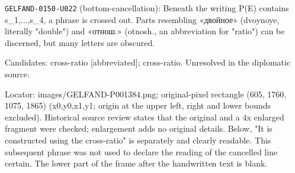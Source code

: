 \noindent\texttt{GELFAND-0150-U022} (bottom-cancellation): Beneath the writing P(E) contains s\_1,...,s\_4, a phrase is crossed out. Parts resembling «двойное» (dvoynoye, literally "double") and «отнош.» (otnosh., an abbreviation for "ratio") can be discerned, but many letters are obscured.\par
Candidates: cross-ratio [abbreviated]; cross-ratio. Unresolved in the diplomatic source.\par
Locator: images/GELFAND-P001384.png; original-pixel rectangle (605, 1760, 1075, 1865) (x0,y0,x1,y1; origin at the upper left, right and lower bounds excluded). Historical source review states that the original and a 4x enlarged fragment were checked; enlargement adds no original details. Below, "It is constructed using the cross-ratio" is separately and clearly readable. This subsequent phrase was not used to declare the reading of the cancelled line certain. The lower part of the frame after the handwritten text is blank.\par
